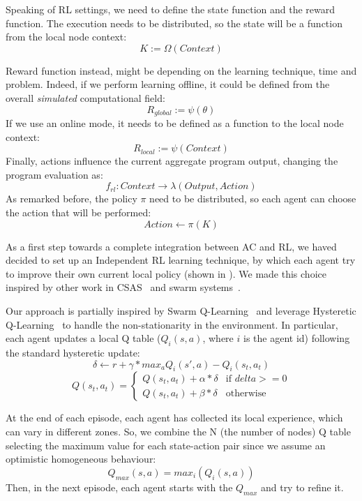 \documentclass[conference]{IEEEtran}
\begin{document}
Speaking of RL settings, we need to define the state function and the reward function.
%
The execution needs to be distributed, so the state will be a function from the local node context:
$$
K := \Omega(\textit{Context})
$$

Reward function instead, might be depending on the learning technique, time and problem. 
 Indeed, if we perform learning offline, it could be defined from the overall \textit{simulated} computational field:
$$
\textit{R}_{global} := \psi({\theta})
$$
If we use an online mode, it needs to be defined as a function to the local node context:
$$
\textit{R}_{local} := \psi(\textit{Context})
$$
Finally, actions influence the current aggregate program output, changing the program evaluation as:
$$
f_{rl} : \textit{Context} \rightarrow \lambda(\textit{Output}, \textit{Action})
$$
As remarked before, the policy $\pi$ need to be distributed, so each agent can choose the action that will be performed:
$$
\textit{Action} \leftarrow \pi(K)
$$

As a first step towards a complete integration between AC and RL, we haved decided to set up an Independent RL learning technique, 
 by which each agent try to improve their own current local policy (shown in ). 
% 
We made this choice inspired by other work in CSAS~\cite{csas-and-marl} and swarm systems~\cite{nguyen2018swarm}.

Our approach is partially inspired by Swarm Q-Learning~\cite{nguyen2018swarm} and leverage Hysteretic Q-Learning~\cite{hysteretic-q} to 
 handle the non-stationarity in the environment.
%
In particular, each agent updates a local Q table ($Q_i(s, a)$, where $i$ is the agent id) following the standard hysteretic update:
$$
\delta \leftarrow r + \gamma * max_a Q_i(s', a) - Q_i(s_t, a_t)
$$
$$
Q(s_t, a_t) =  \begin{cases} 
  Q(s_t, a_t) + \alpha * \delta & \mbox{if } delta >= 0 \\ 
  Q(s_t, a_t) + \beta * \delta & \mbox{otherwise }
\end{cases}
$$

At the end of each episode, each agent has collected its local experience, which can vary in different zones. 
 So, we combine the N (the number of nodes) Q table selecting the maximum value for each state-action pair since we assume an optimistic homogeneous behaviour:
$$
Q_{max}(s, a) = max_i(Q_i(s, a))
$$
Then, in the next episode, each agent starts with the $Q_{max}$ and try to refine it.
\end{document}
